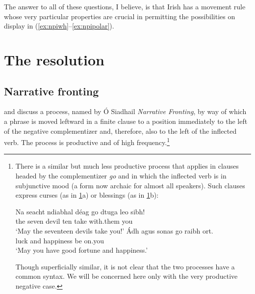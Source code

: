 \documentclass[output=paper,colorlinks,citecolor=brown]{langscibook}
\begin{document}
\noindent The answer to all of these questions, I believe, is that Irish has a movement rule whose very particular properties are crucial in permitting the possibilities on display in (\ref{ex:npiwh}--\ref{ex:npipolar}).

\section{The resolution}
\label{sec:solution}

\subsection{Narrative fronting}
\label{sec:nf}
\citet[\S 9.2.2]{o-siadhail-book} and \citet{mccloskey:96a} discuss a process, named by Ó Siadhail {\itshape Narrative Fronting}, by way of which a phrase is moved leftward in a finite clause to a position immediately to the left of the negative complementizer and, therefore, also to the left of the inflected verb. The process is productive and of high frequency.\footnote{There is a similar but much less productive process that applies in clauses headed by the complementizer {\itshape go} and in which the inflected verb is in subjunctive mood (a form now archaic for almost all speakers). Such clauses express curses (as in \ref{ex:curses}a) or blessings (as in \ref{ex:curses}b):

\ea\label{ex:curses}
\ea
\gll Na seacht ndiabhal déag go dtuga {\gapline} leo sibh! \\
   the seven devil ten {\C} {take\subj} {} with.them {you\pl} \\
\glt `May the seventeen devils take you!'
\ex
\gll Ádh agus sonas go raibh {\gapline} ort.\\
    luck and happiness {\C} {be\subj} {} on.you \\
\glt `May you have good fortune and happiness.'
\z
\z

\noindent Though superficially similar, it is not clear that the two processes have a common syntax. We will be concerned here only with the very productive negative case.}

\end{document}
